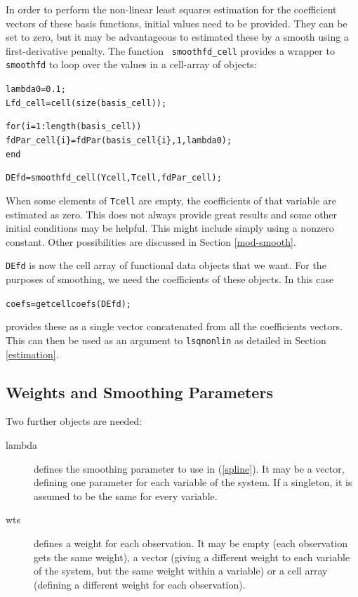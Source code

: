 \documentclass{article}
\newcommand{\nt}    {\noindent}
\begin{document}
In order to perform the non-linear least squares estimation
for the coefficient vectors of these basis functions,
initial values need to be provided. They can be set to
zero, but it may be advantageous to estimated these by a smooth
using a first-derivative penalty. The function {\tt
smoothfd\_cell} provides a wrapper to {\tt smoothfd} to loop
over the values in a cell-array of objects:

\begin{alltt}
   lambda0 = 0.1;
   Lfd_cell = cell(size(basis_cell));

   for(i = 1:length(basis_cell))
     fdPar_cell\{i\} = fdPar(basis_cell\{i\},1,lambda0);
   end

   DEfd = smoothfd_cell(Ycell,Tcell,fdPar_cell);
\end{alltt}

\nt When some elements of {\tt Tcell} are empty, the coefficients of that variable are estimated as
zero. This does not always provide great results and some other initial conditions may be helpful.
This might include simply using a nonzero constant. Other possibilities are discussed in Section
\ref{mod-smooth}.

{\tt DEfd} is now the cell array of functional data objects
that we want. For the purposes of smoothing, we need the
coefficients of these objects. In this case

\begin{alltt}
   coefs = getcellcoefs(DEfd);
\end{alltt}

\nt provides these as a single vector concatenated from
all the coefficients vectors. This can then be used as an
argument to {\tt lsqnonlin} as detailed in Section
\ref{estimation}.

\subsection{Weights and Smoothing Parameters}

\nt Two further objects are needed:

\begin{description}
\item[lambda] defines the smoothing parameter to use in
(\ref{spline}). It may be a vector, defining one parameter for each variable of the system. If a
singleton, it is assumed to be the same for every variable.

\item[wts] defines a weight for each observation. It may be
empty (each observation gets the same weight), a vector (giving a different weight to each variable
of the system, but the same weight within a variable) or a cell array (defining a different weight
for each observation).
\end{description}
\end{document}
